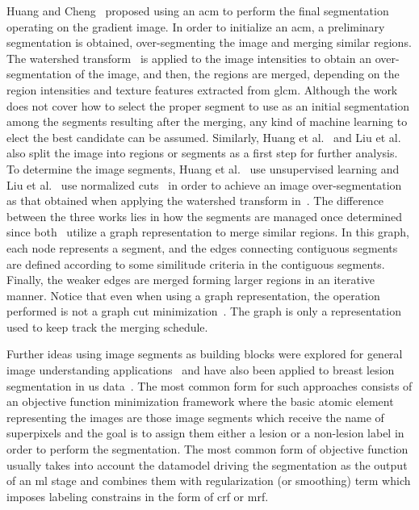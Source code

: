 \documentclass[authoryear,preprint,review,12pt]{elsarticle}
\begin{document}
Huang and Cheng~\cite{Huang:2005p11636} proposed using an \ac{acm} to perform the final segmentation~\cite{lobregt1995discrete} operating on the gradient image. In order to initialize an \ac{acm}, a preliminary segmentation is obtained, over-segmenting the image and merging similar regions. The watershed transform~\cite{beucher1992watershed,najman1996geodesic} is applied to the image intensities to obtain an over-segmentation of the image, and then,  the regions are merged, depending on the region intensities and texture features extracted from \ac{glcm}. Although the work does not cover how to select the proper segment to use as an initial segmentation among the segments resulting after the merging, any kind of machine learning to elect the best candidate can be assumed.
Similarly, Huang et al.~\cite{Huang:2012p14313} and Liu et al.~\cite{Liu:2005p14341} also split the image into regions  or segments as a first step for further analysis. To determine the image segments, Huang et al.~\cite{Huang:2012p14313} use unsupervised learning and Liu et al.~\cite{Liu:2005p14341} use normalized cuts~\cite{shi2000normalized} in order to achieve an image over-segmentation as that obtained when applying the watershed transform in~\cite{Huang:2005p11636}.
The difference between the three works lies in how the segments are managed once determined since both~\cite{Huang:2012p14313,Liu:2005p14341} utilize a graph representation to merge similar regions. In this graph, each node represents a segment, and the edges connecting contiguous segments are defined according to some similitude criteria in the contiguous segments. Finally, the weaker edges are merged forming larger regions in an iterative manner. Notice that even when using a graph representation, the operation performed is not a graph cut minimization~\cite{boykov2001interactive}. The graph is only a representation used to keep track the merging schedule.

Further ideas using image segments as building blocks were explored for general image understanding applications~\cite{fulkerson2009class} and have also been applied to breast lesion segmentation in \ac{us} data~\cite{hao2012combining}. 
The most common form for such approaches consists of an objective function minimization framework where the basic atomic element representing the images are those image segments which receive the name of superpixels and the goal is to assign them either a lesion or a non-lesion label in order to perform the segmentation. The most common form of objective function usually takes into account the datamodel driving the segmentation as the output of an \ac{ml} stage and combines them with regularization (or smoothing) term which imposes labeling constrains in the form of \ac{crf} or \ac{mrf}. 
\end{document}

